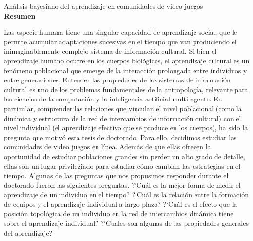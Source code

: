 \documentclass[a4paper,11pt]{book}
\theoremstyle{definition}
\newcommand{\TITULO}[0]{An\'alisis bayesiano del aprendizaje en comunidades de video juegos}
\begin{document}
\thispagestyle{empty}
\phantom{Pagina en blanco}
\newpage


\phantom{.}

\vspace{6cm}

\hfill  {}

\newpage

\phantom{Pagina en blanco}

\newpage

\begin{center}
\Large \TITULO \normalsize \\[0.5cm]

\textbf{Resumen}
\end{center}

\small

Las especie humana tiene una singular capacidad de aprendizaje social, que le permite acumular adaptaciones sucesivas en el tiempo que van produciendo el inimaginablemente complejo sistema de informaci\'on cultural.
%
Si bien el aprendizaje humano ocurre en los cuerpos biol\'ogicos, el aprendizaje cultural es un fen\'omeno poblacional que emerge de la interacci\'on prolongada entre individuos y entre generaciones.
%
Entender las propiedades de los sistemas de informaci\'on cultural es uno de los problemas fundamentales de la antropolog\'ia, relevante para las ciencias de la computaci\'on y la inteligencia artificial multi-agente.
%
En particular, comprender las relaciones que vinculan el nivel poblacional (como la din\'amica y estructura de la red de intercambios de informaci\'on cultural)
con el nivel individual (el aprendizaje efectivo que se produce en los cuerpos), ha sido la pregunta que motiv\'o esta tesis de doctorado.
%
Para ello, decidimos estudiar las comunidades de video juegos en l\'inea.
%
Adem\'as de que ellas ofrecen la oportunidad de estudiar poblaciones grandes sin perder un alto grado de detalle, ellas son un lugar privilegiado para estudiar c\'omo cambian las estrategias en el tiempo.
%
Algunas de las preguntas que nos propusimos responder durante el doctorado fueron las siguientes preguntas.
%
?`Cu\'al es la mejor forma de medir el aprendizaje de un individuo en el tiempo?
?`Cu\'al es la relaci\'on entre la formaci\'on de equipos y el aprendizaje individual a largo plazo?
?`Cu\'al es el efecto que la posici\'on topol\'ogica de un individuo en la red de intercambios din\'amica tiene sobre el aprendizaje individual?
?`Cuales son algunas de las propiedades generales del aprendizaje?
\end{document}
